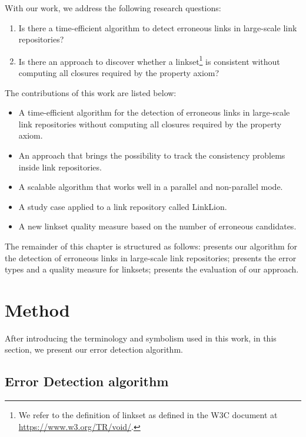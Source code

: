 With our work, we address the following research questions:
\begin{enumerate}
	\item Is there a time-efficient algorithm to detect erroneous links in large-scale link repositories?
	\item Is there an approach to discover whether a linkset\footnote{We refer to the definition of linkset as defined in the W3C document at \url{https://www.w3.org/TR/void/}.} is consistent without computing all closures required by the property axiom?
\end{enumerate}
%
The contributions of this work are listed below:
\begin{itemize}
	\item A time-efficient algorithm for the detection of erroneous links in large-scale link repositories without computing all closures required by the property axiom.
	\item An approach that brings the possibility to track the consistency problems inside link repositories.
	\item A scalable algorithm that works well in a parallel and non-parallel mode.
	\item A study case applied to a link repository called LinkLion.
	\item A new linkset quality measure based on the number of erroneous candidates.
\end{itemize} 
%
The remainder of this chapter is structured as follows:  presents our algorithm for the detection of erroneous links in large-scale link repositories;  presents the error types and a quality measure for linksets;  presents the evaluation of our approach.

\section{Method} \label{approach}
After introducing the terminology and symbolism used in this work, in this section, we present our error detection algorithm.

\subsection{Error Detection algorithm}

